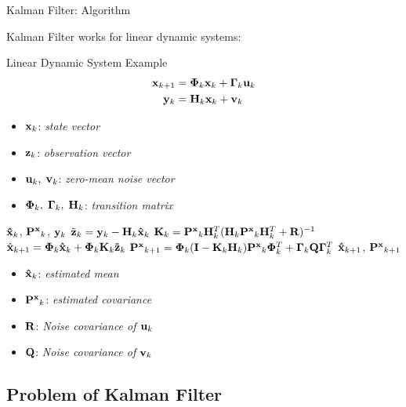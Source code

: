 \begin{frame}[allowframebreaks]{Kalman Filter: Algorithm}  %

Kalman Filter works for linear dynamic systems:
\begin{block}{Linear Dynamic System Example}
\begin{align*}
{\bf x}_{k+1} &= {\bf \Phi}_k{\bf x}_{k} + {\bf \Gamma}_k{\bf u}_{k}\notag\\
{\bf y}_{k} &= {\bf H}_k{\bf x}_{k} + {\bf v}_{k}
\end{align*}   
\begin{itemize}
    \item ${\bf x}_k$: {\it state vector}
    \item ${\bf z}_k$: {\it observation vector}
    \item ${\bf u}_k,\; {\bf v}_k$: {\it zero-mean noise vector}
    \item ${\bf \Phi}_k, \; {\bf \Gamma}_k, \; {\bf H}_k$: {\it transition matrix}
\end{itemize}
\end{block}

\pause

\begin{algorithm}[H]
\caption{Classic Kalman Filter}
\begin{algorithmic}[1]
\REQUIRE ${\bf \hat x}_k$, ${\bf P^x}_{k}$, ${\bf y}_k$
\STATE $\tilde {\bf z}_k = {\bf y}_k - {\bf H}_k{\bf \hat x}_k$
\STATE ${\bf K}_k = {\bf P^x}_k{\bf H}^T_k({\bf H}_k{\bf P^x}_k{\bf H}^T_k+{\bf R})^{-1}$
\STATE $\hat{\bf x}_{k+1} = {\bf \Phi}_k{\bf \hat x}_k+{\bf \Phi}_k{\bf K}_k{\bf \tilde z}_k$
\STATE ${\bf P^x}_{k+1} = {\bf \Phi}_k({\bf I}-{\bf K}_k{\bf H}_k){\bf P^x}_k{\bf \Phi}^T_k + {\bf \Gamma}_k{\bf Q}{\bf \Gamma}_k^T$
\ENSURE ${\bf \hat x}_{k+1}$, ${\bf P^x}_{k+1}$
\end{algorithmic}
\end{algorithm}

\begin{itemize}
    \item ${\bf \hat x}_k$: {\it estimated mean}
    \item ${\bf P^x}_k$: {\it estimated covariance}
    \item ${\bf R}$: {\it Noise covariance of ${\bf u}_k$}
    \item ${\bf Q}$: {\it Noise covariance of ${\bf v}_k$}
\end{itemize}
\end{frame}

\subsection{Problem of Kalman Filter}

